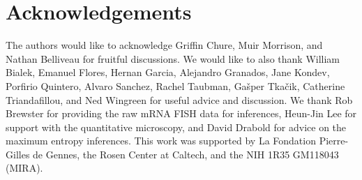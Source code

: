\section*{Acknowledgements}

The authors would like to acknowledge Griffin Chure, Muir Morrison, and Nathan
Belliveau for fruitful discussions. We would like to also thank William Bialek,
Emanuel Flores, Hernan Garcia, Alejandro Granados, Jane Kondev, Porfirio
Quintero, Alvaro Sanchez, Rachel Taubman, Gašper Tkačik, Catherine
Triandafillou, and Ned Wingreen for useful advice and discussion. We thank Rob
Brewster for providing the raw mRNA FISH data for inferences, Heun-Jin Lee for
support with the quantitative microscopy, and David Drabold for advice on the
maximum entropy inferences. This work was supported by La Fondation
Pierre-Gilles de Gennes, the Rosen Center at Caltech, and the NIH 1R35 GM118043
(MIRA).
